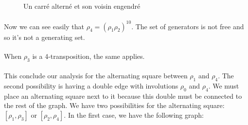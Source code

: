 \begin{figure}[H]
  \begin{center}
    \caption{Un carré alterné et son voisin engendré}
  \end{center}
\end{figure}

\paragraph{}
Now we can see easily that $\rho_4 = (\rho_1 \rho_2)^{10}$. The set of generators is not free and so it's not a generating set.

\paragraph{}
When $\rho_3$ is a 4-transposition, the same applies.

\paragraph{}
This conclude our analysis for the alternating square between $\rho_1$ and $\rho_4$. The second possibility is having a double edge with involutions $\rho_0$ and $\rho_4$. We must place an alternating square next to it because this double must be connected to the rest of the graph. We have two possibilities for the alternating square: $[\rho_1, \rho_3]$ or $[\rho_2, \rho_4]$. In the first case, we have the following graph:

